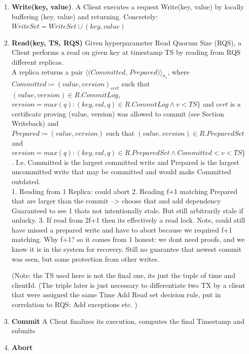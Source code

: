 \begin{enumerate}
\item \textbf{Write(key, value)}. A Client executes a request Write(key, value) by locally buffering (key, value) and returning. Concretely: $WriteSet = WriteSet \cup (key, value)$
\item \textbf{Read(key, TS, RQS)} Given hyperparameter Read Quorum Size (RQS), a Client performs a read on given key at timestamp TS by reading from RQS different replicas. \\

A replica returns a pair $\langle \textit{(Committed, Prepared)} \rangle _{\sigma_r}$, where \\
$Committed \coloneqq (value, version)_{cert}$ such that $ (value, version) \in R.CommitLog$, $version = max(q) : (key, val, q) \in R.CommitLog \land v < TS \}$ and $cert$ is a certificate proving (value, version) was allowed to commit (see Section Writeback) and\\
 $Prepared \coloneqq (value, version)$ such that $(value, version) \in R.PreparedSet$ and $version = max(q) : (key, val, q) \in R.PreparedSet \land Committed < v < TS \}$ .
I.e. Committed is the largest committed write and Prepared is the largest uncommitted write that may be  committed and would make Committed outdated. \\

1. Reading from 1 Replica: could abort
2. Reading f+1 matching Prepared that are larger than the commit --> choose that and add dependency
Guaranteed to see 1 thats not intentionally stale. But still arbitrarily stale if unlucky.
3. If read from 2f+1 then its effectively a read lock. Note, could still have missed a prepared write and have to abort because we required f+1 matching. Why f+1? so it comes from 1 honest: we dont need proofs, and we know it is in the system for recovery.
Still no guarantee that newest commit was seen, but some protection from other writes.


(Note: the TS used here is not the final one, its just the tuple of time and clientId. (The triple later is just necessary to differentiate two TX by a client that were assigned the same Time
Add Read set decision rule, put in correlation to RQS: 
Add exceptions etc.
)


\item \textbf{Commit} A Client finalizes its execution, computes the final Timestamp and submits 

\item \textbf{Abort}

\end{enumerate}
 


